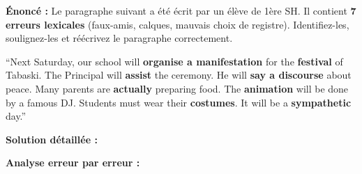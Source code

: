 \documentclass[11pt]{article}
\begin{document}
\begin{exoresolu}
\textbf{Énoncé :} Le paragraphe suivant a été écrit par un élève de 1ère SH. Il contient \textbf{7 erreurs lexicales} (faux-amis, calques, mauvais choix de registre). Identifiez-les, soulignez-les et réécrivez le paragraphe correctement.

\begin{textebox}
``Next Saturday, our school will \textbf{organise a manifestation} for the \textbf{festival} of Tabaski. The Principal will \textbf{assist} the ceremony. He will \textbf{say a discourse} about peace. Many parents are \textbf{actually} preparing food. The \textbf{animation} will be done by a famous DJ. Students must wear their \textbf{costumes}. It will be a \textbf{sympathetic} day.''
\end{textebox}

\tcblower
\textbf{Solution détaillée :}

\textbf{Analyse erreur par erreur :}


\end{exoresolu}
\end{document}

